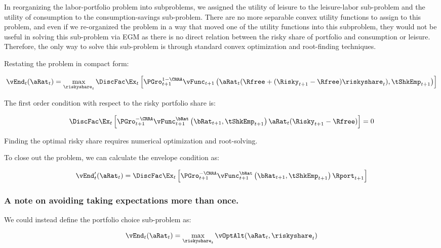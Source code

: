 \documentclass[\econtexRoot/SequentialEGM]{subfiles}
\begin{document}
In reorganizing the labor-portfolio problem into subproblems, we assigned the utility of leisure to the leisure-labor sub-problem and the utility of consumption to the consumption-savings sub-problem. There are no more separable convex utility functions to assign to this problem, and even if we re-organized the problem in a way that moved one of the utility functions into this subproblem, they would not be useful in solving this sub-problem via EGM as there is no direct relation between the risky share of portfolio and consumption or leisure. Therefore, the only way to solve this sub-problem is through standard convex optimization and root-finding techniques.

Restating the problem in compact form:

\begin{equation}
        \vEnd_{t}(\aRat_{t}) = \max_{\riskyshare_{t}} \DiscFac \Ex_{t} \left[ \PGro_{t+1}^{1-\CRRA}
        \vFunc_{t+1}\left(\aRat_{t}(\Rfree + (\Risky_{t+1} - \Rfree) \riskyshare_{t}), \tShkEmp_{t+1}\right)
        \right]
\end{equation}

The first order condition with respect to the risky portfolio share is:

\begin{equation}
        \DiscFac \Ex_{t} \left[ \PGro_{t+1}^{-\CRRA} \vFunc_{t+1}^{\bRat}\left(\bRat_{t+1}, \tShkEmp_{t+1}\right) \aRat_{t}(\Risky_{t+1} - \Rfree)  \right] = 0
\end{equation}

Finding the optimal risky share requires numerical optimization and root-solving.

To close out the problem, we can calculate the envelope condition as:

\begin{equation}
        \vEnd_{t}'(\aRat_{t}) = \DiscFac \Ex_{t} \left[ \PGro_{t+1}^{-\CRRA} \vFunc_{t+1}^{\bRat}\left(\bRat_{t+1}, \tShkEmp_{t+1}\right) \Rport_{t+1}  \right]
\end{equation}

\subsubsection{A note on avoiding taking expectations more than once.}

We could instead define the portfolio choice sub-problem as:

\begin{equation}
        \vEnd_{t}(\aRat_{t}) = \max_{\riskyshare_{t}} \vOptAlt(\aRat_{t}, \riskyshare_{t})
\end{equation}
\end{document}
